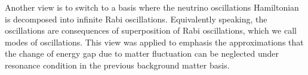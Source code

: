 Another view is to switch to a basis where the neutrino oscillations Hamiltonian is decomposed into infinite Rabi oscillations. Equivalently speaking, the oscillations are consequences of superposition of Rabi oscillations, which we call modes of oscillations. This view was applied to emphasis the approximations that the change of energy gap due to matter fluctuation can be neglected under resonance condition in the previous background matter basis.












